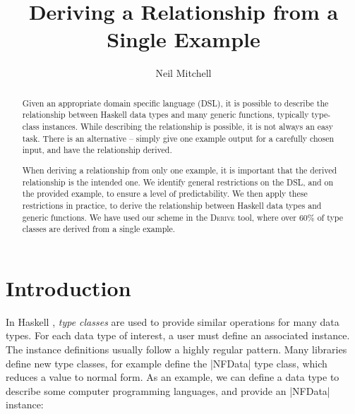\documentclass{llncs}
\newcommand{\derive}{\textsc{Derive}}
\newcommand\citet\cite
\begin{document}
\title{Deriving a Relationship from a Single Example}
\author{Neil Mitchell}

\maketitle


\begin{abstract}
Given an appropriate domain specific language (DSL), it is possible to describe the relationship between Haskell data types and many generic functions, typically type-class instances. While describing the relationship is possible, it is not always an easy task. There is an alternative -- simply give one example output for a carefully chosen input, and have the relationship derived.

When deriving a relationship from only one example, it is important that the derived relationship is the intended one. We identify general restrictions on the DSL, and on the provided example, to ensure a level of predictability. We then apply these restrictions in practice, to derive the relationship between Haskell data types and generic functions. We have used our scheme in the \derive{} tool, where over 60\% of type classes are derived from a single example.
\end{abstract}

\begin{comment}
\category{D.3}{Software}{Programming Languages}

\terms
Languages

\keywords
Haskell, Domain Specific Languages
\end{comment}

\section{Introduction}
\label{sec:introduction}

In Haskell \cite{haskell}, \textit{type classes} \cite{wadler:type_classes} are used to provide similar operations for many data types. For each data type of interest, a user must define an associated instance. The instance definitions usually follow a highly regular pattern. Many libraries define new type classes, for example \citet{trinder:strategies} define the |NFData| type class, which reduces a value to normal form. As an example, we can define a data type to describe some computer programming languages, and provide an |NFData| instance:
\end{document}
